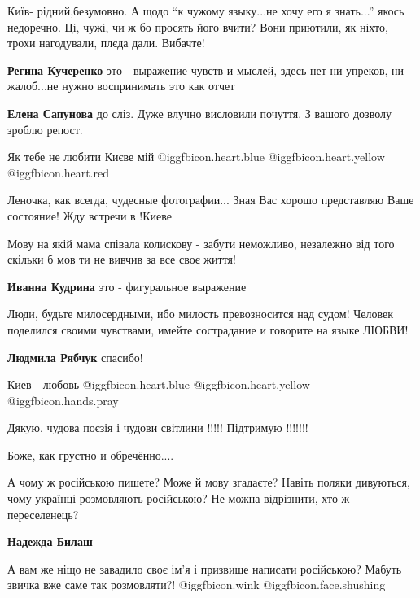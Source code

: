 \begin{itemize}
Київ- рідний,безумовно. А щодо \enquote{к чужому языку...не хочу его я знать...}
якось недоречно. Ці, чужі, чи ж бо просять його вчити? Вони приютили, як
ніхто, трохи нагодували, плєда дали. Вибачте!

\begin{itemize} %
\textbf{Регина Кучеренко} это - выражение чувств и мыслей, здесь нет ни упреков, ни жалоб...не нужно воспринимать это как отчет

\textbf{Елена Сапунова} до сліз. Дуже влучно висловили почуття. З вашого дозволу зроблю репост.
\end{itemize} %

Як тебе не любити Києве мій @igg{fbicon.heart.blue}  @igg{fbicon.heart.yellow} @igg{fbicon.heart.red}

Леночка, как всегда, чудесные фотографии...
Зная Вас хорошо представляю Ваше состояние!
Жду встречи в !Киеве

Мову на якій мама співала колискову - забути неможливо, незалежно від того скільки б мов ти не вивчив за все своє життя!

\textbf{Иванна Кудрина} это - фигуральное выражение

Люди, будьте милосердными, ибо милость превозносится над судом! Человек поделился своими чувствами, имейте сострадание и говорите на языке ЛЮБВИ!

\textbf{Людмила Рябчук} спасибо!

Киев - любовь  @igg{fbicon.heart.blue}  @igg{fbicon.heart.yellow}  @igg{fbicon.hands.pray} 

Дякую, чудова поєзія і чудови світлини !!!!! Підтримую !!!!!!!

Боже, как грустно и обречённо....


А чому ж російською пишете? Може й мову згадаєте? Навіть поляки дивуються,
чому українці розмовляють російською? Не можна відрізнити, хто ж переселенець?

\begin{itemize} %
\textbf{Надежда Билаш}

А вам же ніщо не завадило своє ім'я і призвище написати російською? Мабуть
звичка вже саме так розмовляти?! @igg{fbicon.wink}  @igg{fbicon.face.shushing} 


\end{itemize}
\end{itemize}
